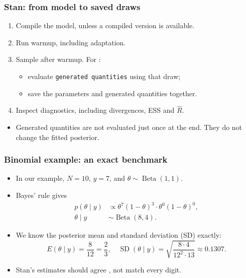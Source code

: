 \documentclass[10pt]{beamer}
\begin{document}
\begin{frame}

\frametitle{Stan: from model to saved draws}

  \begin{enumerate}
  \item Compile the model, unless a compiled version is available.
  \item Run warmup, including adaptation.
  \item Sample after warmup. For :
    \begin{itemize}
    \item evaluate \texttt{generated quantities} using that draw;
    \item save the parameters and generated quantities together.
    \end{itemize}
  \item Inspect diagnostics, including divergences, ESS and $\widehat R$.
  \end{enumerate}

  \begin{itemize}
  \item Generated quantities are not evaluated just once at the end.
    They do not change the fitted posterior.
  \end{itemize}

\end{frame}

\begin{frame}
\frametitle{Binomial example: an exact benchmark}

\begin{itemize}
\item In our example, $N=10$, $y=7$, and $\theta\sim\operatorname{Beta}(1,1)$.
\item Bayes' rule gives
  \begin{align*}
  p(\theta\mid y)&\propto
    \theta^7(1-\theta)^3\cdot\theta^0(1-\theta)^0,\\
  \theta\mid y&\sim\operatorname{Beta}(8,4).
  \end{align*}
\pause
\item We know the posterior mean and standard deviation (SD) exactly:
  \[
  E(\theta\mid y)=\frac{8}{12}=\frac23,
  \quad
  \operatorname{SD}(\theta\mid y)
    =\sqrt{\frac{8\cdot4}{12^2\cdot13}}\approx0.1307.
  \]
\item Stan's estimates should agree ,
  not match every digit.
\end{itemize}
\end{frame}
\end{document}

